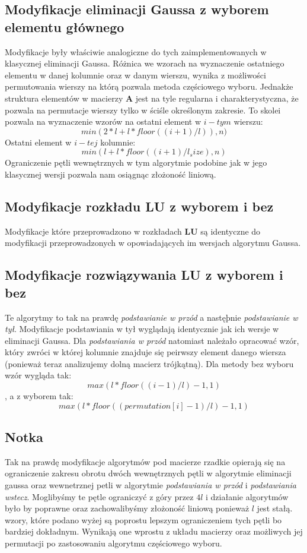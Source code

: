 \documentclass[]{article}
\begin{document}
\subsection{Modyfikacje eliminacji Gaussa z wyborem elementu głównego}
Modyfikacje były właściwie analogiczne do tych zaimplementowanych w klasycznej eliminacji Gaussa. Różnica we wzorach na wyznaczenie ostatniego elementu w danej kolumnie oraz w danym wierszu, wynika z możliwości permutowania wierszy na którą pozwala metoda częściowego wyboru. Jednakże struktura elementów  w macierzy \textbf{A} jest na tyle regularna i charakterystyczna, że pozwala na permutacje wierszy tylko w ściśle określonym zakresie. To skolei pozwala na wyznaczenie wzorów na ostatni element w $i-tym$ wierszu:
\[ min(2 * l + l * floor((i + 1) / l)), n)\]
Ostatni element w $i-tej$ kolumnie:
\[min(l + l * floor((i + 1) / l_size), n)\]
Ograniczenie pętli wewnętrznych w tym algorytmie podobine jak w jego klasycznej wersji pozwala nam osiągnąc złożoność liniową.
\subsection{Modyfikacje rozkładu LU z wyborem i bez}
Modyfikacje które przeprowadzono w rozkładach \textbf{LU} są identyczne do modyfikacji przeprowadzonych w opowiadających im wersjach algorytmu Gaussa.
\subsection{Modyfikacje rozwiązywania LU z wyborem i bez}
Te algorytmy to tak na prawdę \textit{podstawianie w przód} a nastęþnie \textit{podstawianie w tył}. Modyfikacje podstawiania w tył wyglądają identycznie jak ich wersje w eliminacji Gaussa. Dla \textit{podstawiania w przód} natomiast należało opracować wzór, który zwróci w której kolumnie znajduje się peirwszy element danego wiersza (ponieważ teraz analizujemy dolną macierz trójkątną). Dla metody bez wyboru wzór wygląda tak:
	\[max(l* floor((i - 1) / l) - 1, 1)\]
, a z wyborem tak:
\[max(l * floor((permutation[i] - 1) / l) - 1, 1)\]
\subsection{Notka}
Tak na prawdę modyfikacje algorytmów pod macierze rzadkie opierają się na ograniczenie zakresu obrotu dwóch wewnętrznych pętli w algorytmie eliminacji gaussa oraz wewnetrznej petli w algorytmie \textit{podstawiania w przód} i \textit{podstawiania wstecz}. Moglibyśmy te pętle ograniczyć z góry przez $4l$ i działanie algorytmów było by poprawne oraz zachowalibyśmy złożoność liniową ponieważ $l$ jest stałą. wzory, które podano wyżej są poprostu lepszym ograniczeniem tych pętli bo bardziej dokładnym. Wynikają one wprostu z układu macierzy oraz możliwych jej permutacji po zastosowaniu algorytmu częściowego wyboru. 
\newpage
\end{document}
